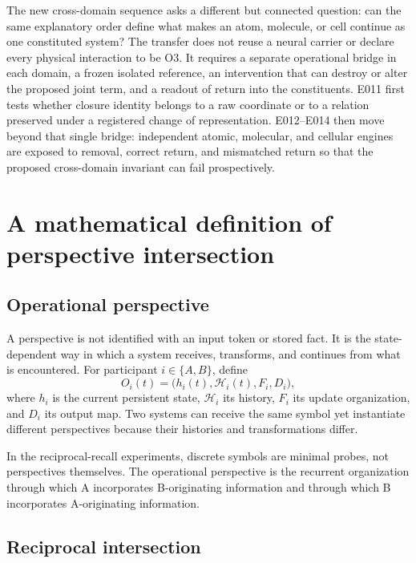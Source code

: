 \documentclass[11pt,a4paper]{article}
\begin{document}
The new cross-domain sequence asks a different but connected question: can the same explanatory order define what makes an atom, molecule, or cell continue as one constituted system? The transfer does not reuse a neural carrier or declare every physical interaction to be O3. It requires a separate operational bridge in each domain, a frozen isolated reference, an intervention that can destroy or alter the proposed joint term, and a readout of return into the constituents. E011 first tests whether closure identity belongs to a raw coordinate or to a relation preserved under a registered change of representation. E012--E014 then move beyond that single bridge: independent atomic, molecular, and cellular engines are exposed to removal, correct return, and mismatched return so that the proposed cross-domain invariant can fail prospectively.

\section{A mathematical definition of perspective intersection}

\subsection{Operational perspective}

A perspective is not identified with an input token or stored fact. It is the state-dependent way in which a system receives, transforms, and continues from what is encountered. For participant $i\in\{A,B\}$, define
\begin{equation}
 O_i(t)=\bigl(h_i(t),\mathcal H_i(t),F_i,D_i\bigr),
 \label{eq:perspective}
\end{equation}
where $h_i$ is the current persistent state, $\mathcal H_i$ its history, $F_i$ its update organization, and $D_i$ its output map. Two systems can receive the same symbol yet instantiate different perspectives because their histories and transformations differ.

In the reciprocal-recall experiments, discrete symbols are minimal probes, not perspectives themselves. The operational perspective is the recurrent organization through which A incorporates B-originating information and through which B incorporates A-originating information.

\subsection{Reciprocal intersection}
\end{document}

